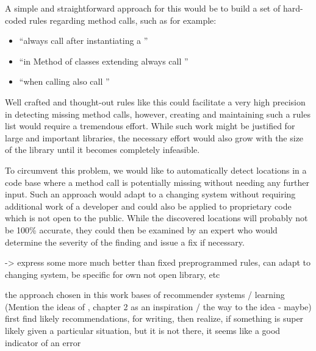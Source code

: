 A simple and straightforward approach for this would be to build a set of hard-coded rules regarding method calls, such as for example:
\begin{itemize}
    \item ``always call  after instantiating a ''
    \item ``in Method  of classes extending  always call ''
    \item ``when calling  also call ''
\end{itemize}
Well crafted and thought-out rules like this could facilitate a very high precision in detecting missing method calls, however, creating and maintaining such a rules list would require a tremendous effort.
While such work might be justified for large and important libraries, the necessary effort would also grow with the size of the library until it becomes completely infeasible.

To circumvent this problem, we would like to automatically detect locations in a code base where a method call is potentially missing without needing any further input.
Such an approach would adapt to a changing system without requiring additional work of a developer and could also be applied to proprietary code which is not open to the public.
While the discovered locations will probably not be 100\% accurate, they could then be examined by an expert who would determine the severity of the finding and issue a fix if necessary.

-> express some more much better than fixed preprogrammed rules, can adapt to changing system, be specific for own not open library, etc

the approach chosen in this work bases of recommender systems / learning
(Mention the ideas of \cite{bruch2012ide}, chapter 2 as an inspiration / the way to the idea - maybe)
first find likely recommendations, for writing, then realize, if something is super likely given a particular situation, but it is not there, it seems like a good indicator of an error

